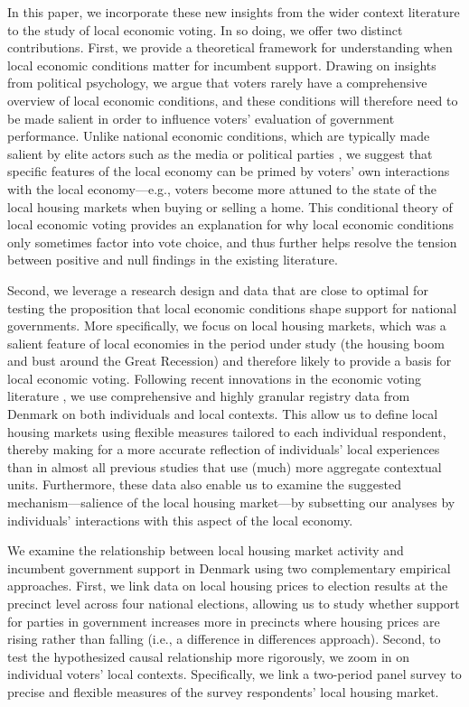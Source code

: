 \documentclass[12pt,a4paper]{article}
\begin{document}
	In this paper, we incorporate these new insights from the wider context literature to the study of local economic voting. In so doing, we offer two distinct contributions. First, we provide a theoretical framework for understanding when local economic conditions matter for incumbent support. Drawing on insights from political psychology, we argue that voters rarely have a comprehensive overview of local economic conditions, and these conditions will therefore need to be made salient in order to influence voters’ evaluation of government performance. Unlike national economic conditions, which are typically made salient by elite actors such as the media \citep{hart2013can} or political parties \citep{bisgaard2017partisan}, we suggest that specific features of the local economy can be primed by voters’ own interactions with the local economy—e.g., voters become more attuned to the state of the local housing markets when buying or selling a home. This conditional theory of local economic voting provides an explanation for why local economic conditions only sometimes factor into vote choice, and thus further helps resolve the tension between positive and null findings in the existing literature.
	
	Second, we leverage a research design and data that are close to optimal for testing the proposition that local economic conditions shape support for national governments. More specifically, we focus on local housing markets, which was a salient feature of local economies in the period under study (the housing boom and bust around the Great Recession) and therefore likely to provide a basis for local economic voting. Following recent innovations in the economic voting literature \citep{healy2017digging}, we use comprehensive and highly granular registry data from Denmark on both individuals and local contexts. This allow us to define local housing markets using flexible measures tailored to each individual respondent, thereby making for a more accurate reflection of individuals’ local experiences than in almost all previous studies that use (much) more aggregate contextual units. Furthermore, these data also enable us to examine the suggested mechanism—salience of the local housing market—by subsetting our analyses by individuals’ interactions with this aspect of the local economy.  
	
	We examine the relationship between local housing market activity and incumbent government support in Denmark using two complementary empirical approaches. First, we link data on local housing prices to election results at the precinct level across four national elections, allowing us to study whether support for parties in government increases more in precincts where housing prices are rising rather than falling (i.e., a difference in differences approach). Second, to test the hypothesized causal relationship more rigorously, we zoom in on individual voters' local contexts. Specifically, we link a two-period panel survey to precise and flexible measures of the survey respondents’ local housing market.
	
\end{document}
